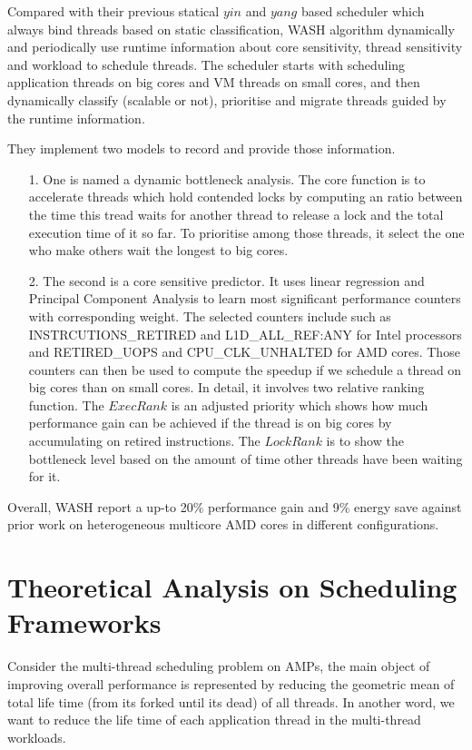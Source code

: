 \documentclass[pageno]{jpaper}
\begin{document}
Compared with their previous statical $yin$ and $yang$ based scheduler \cite{cao2012yin} which always bind threads based on static classification, WASH algorithm dynamically and periodically use runtime information about core sensitivity, thread sensitivity and workload to schedule threads. The scheduler starts with scheduling application threads on big cores and VM threads on small cores, and then dynamically classify (scalable or not), prioritise and migrate threads guided by the runtime information.

They implement two models to record and provide those information.
\begin{itemize}
\item[1.] One is named a dynamic bottleneck analysis. The core function is to accelerate threads which hold contended locks by computing an ratio between the time this tread waits for another thread to release a lock and the total execution time of it so far. To prioritise among those threads, it select the one who make others wait the longest to big cores.
\item[2.] The second is a core sensitive predictor. It uses linear regression and Principal Component Analysis to learn most significant performance counters with corresponding weight. The selected counters include such as INSTRCUTIONS\_RETIRED and  L1D\_ALL\_REF:ANY for Intel processors and RETIRED\_UOPS and CPU\_CLK\_UNHALTED for AMD cores. Those counters can then be used to compute the speedup if we schedule a thread on big cores than on small cores. In detail, it involves two relative ranking function. The $ExecRank$ is an adjusted priority which shows how much performance gain can be achieved if the thread is on big cores by accumulating on retired instructions. The $LockRank$ is to show the bottleneck level based on the amount of time other threads have been waiting for it. 
\end{itemize}
Overall, WASH report a up-to 20\% performance gain and 9\% energy save against prior work on heterogeneous multicore AMD cores in different configurations. 




\section{Theoretical Analysis on Scheduling Frameworks}
Consider the multi-thread scheduling problem on AMPs, the main object of improving overall performance is represented by reducing the geometric mean of total life time (from its forked until its dead) of all threads. In another word, we want to reduce the life time of each application thread in the multi-thread workloads.
\end{document}
